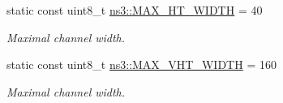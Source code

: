 \begin{DoxyCompactItemize}
static const uint8\+\_\+t \hyperlink{namespacens3_a8458cf81b47edd1b0c4dc3f67f71732d}{ns3\+::\+M\+A\+X\+\_\+\+H\+T\+\_\+\+W\+I\+D\+TH} = 40
\begin{DoxyCompactList}\small\item\em Maximal channel width. \end{DoxyCompactList}\item 
static const uint8\+\_\+t \hyperlink{namespacens3_ad1feeeb53faa6f7afe727b75ee20c36d}{ns3\+::\+M\+A\+X\+\_\+\+V\+H\+T\+\_\+\+W\+I\+D\+TH} = 160
\begin{DoxyCompactList}\small\item\em Maximal channel width. \end{DoxyCompactList}\end{DoxyCompactItemize}
